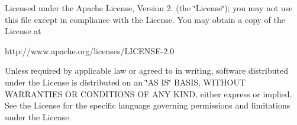 Licensed under the Apache License, Version 2. (the \char`\"{}\+License\char`\"{}); you may not use this file except in compliance with the License. You may obtain a copy of the License at \begin{DoxyVerb}http://www.apache.org/licenses/LICENSE-2.0
\end{DoxyVerb}


Unless required by applicable law or agreed to in writing, software distributed under the License is distributed on an \char`\"{}\+A\+S I\+S\char`\"{} B\+A\+S\+IS, W\+I\+T\+H\+O\+UT W\+A\+R\+R\+A\+N\+T\+I\+ES OR C\+O\+N\+D\+I\+T\+I\+O\+NS OF A\+NY K\+I\+ND, either express or implied. See the License for the specific language governing permissions and limitations under the License. 